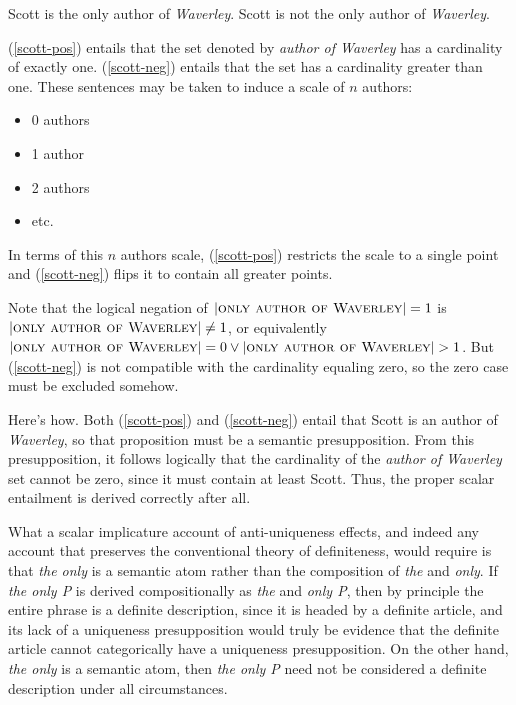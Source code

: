 \documentclass{article}
\begin{document}
\begin{exe}
	\ex \label{scott-pos} Scott is the only author of \textit{Waverley}.
	\ex \label{scott-neg} Scott is not the only author of \textit{Waverley}.
\end{exe}

(\ref{scott-pos}) entails that the set denoted by \textit{author of Waverley} has a cardinality of exactly one. (\ref{scott-neg}) entails that the set has a cardinality greater than one. These sentences may be taken to induce a scale of $n$ authors:

\begin{itemize}
	\item 0 authors
	\item 1 author
	\item 2 authors
	\item etc.
\end{itemize}


In terms of this $n$ authors scale, (\ref{scott-pos}) restricts the scale to a single point and (\ref{scott-neg}) flips it to contain all greater points.

Note that the logical negation of $|\textsc{only author of Waverley}| = 1$ is
$|\textsc{only author of Waverley}| \ne 1$, or equivalently $|\textsc{only author of Waverley}| = 0 \lor |\textsc{only author of Waverley}| > 1$. But (\ref{scott-neg}) is not compatible with the cardinality equaling zero, so the zero case must be excluded somehow.

Here's how. Both (\ref{scott-pos}) and (\ref{scott-neg}) entail that Scott is an author of \textit{Waverley}, so that proposition must be a semantic presupposition. From this presupposition, it follows logically that the cardinality of the \textit{author of Waverley} set cannot be zero, since it must contain at least Scott. Thus, the proper scalar entailment is derived correctly after all.

What a scalar implicature account of anti-uniqueness effects, and indeed any account that preserves the conventional theory of definiteness, would require is that \textit{the only} is a semantic atom rather than the composition of \textit{the} and \textit{only}. If \textit{the only P} is derived compositionally as \textit{the} and \textit{only P}, then by principle the entire phrase is a definite description, since it is headed by a definite article, and its lack of a uniqueness presupposition would truly be evidence that the definite article cannot categorically have a uniqueness presupposition. On the other hand, \textit{the only} is a semantic atom, then \textit{the only P} need not be considered a definite description under all circumstances.
\end{document}
